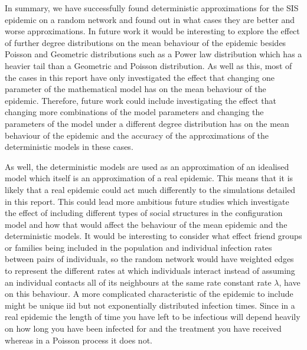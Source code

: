 \documentclass{uonmathsreport}
\begin{document}
In summary, we have successfully found deterministic approximations for the SIS epidemic on a random network and found out in what cases they are better and worse approximations. In future work it would be interesting to explore the effect of further degree distributions on the mean behaviour of the epidemic besides Poisson and Geometric distributions such as a Power law distribution which has a heavier tail than a Geometric and Poisson distribution. As well as this, most of the cases in this report have only investigated the effect that changing one parameter of the mathematical model has on the mean behaviour of the epidemic. Therefore, future work could include investigating the effect that changing more combinations of the model parameters and changing the parameters of the model under a different degree distribution has on the mean behaviour of the epidemic and the accuracy of the approximations of the deterministic models in these cases.

As well, the deterministic models are used as an approximation of an idealised model which itself is an approximation of a real epidemic. This means that it is likely that a real epidemic could act much differently to the simulations detailed in this report. This could lead more ambitious future studies which investigate the effect of including different types of social structures in the configuration model and how that would affect the behaviour of the mean epidemic and the deterministic models. It would be interesting to consider what effect friend groups or families being included in the population and individual infection rates between pairs of individuals, so the random network would have weighted edges to represent the different rates at which individuals interact instead of assuming an individual contacts all of its neighbours at the same rate constant rate $\lambda$, have on this behaviour. A more complicated characteristic of the epidemic to include might be unique iid but not exponentially distributed infection times. Since in a real epidemic the length of time you have left to be infectious will depend heavily on how long you have been infected for and the treatment you have received whereas in a Poisson process it does not.

\newpage
\listoffigures
\end{document}
